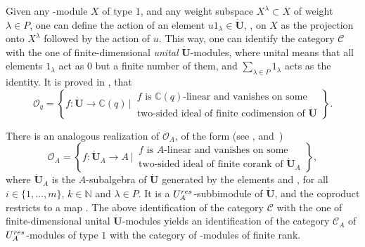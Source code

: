 \documentclass[11pt]{article}
\numberwithin{equation}{section}
\numberwithin{equation}{section}
\theoremstyle{definition}
\newcommand{\mc}{\mathbb{C}}
\newcommand{\mn}{\mathbb{N}}
\newcommand{\Oo}{{\mathcal O}}
\newcommand{\ra}{\rightarrow}
\begin{document}
Given any -module $X$ of type $1$, and any weight subspace $X^\lambda\subset X$ of weight $\lambda\in P$, one can define the action of an element $u 1_\lambda \in \dot{\mathbf{U}}$, , on $X$ as the projection onto $X^\lambda$ followed by the action of $u$. This way, one can identify the category $\mathcal{C}$ with the one of finite-dimensional {\it unital} $\dot{\mathbf{U}}$-modules, where unital means that all elements $1_\lambda$ act as $0$ but a finite number of them, and $ \sum_{\lambda\in P} 1_\lambda$ acts as the identity. It is proved in \cite[Section~29.5.1]{Lusztig}, that
\[%
\Oo_q = \left\lbrace f\colon \dot{\mathbf{U}} \ra \mc(q) \, \bigg\vert \, \begin{matrix} \text{$f$ is $\mc(q)$-linear and vanishes on some}\\ \text{two-sided ideal of finite codimension of $\dot{\mathbf{U}}$} \end{matrix}\right\rbrace.
\]

There is an analogous realization of $\Oo_A$, of the form (see \cite[Sections~23.2 and~29.5.2]{Lusztig}, and~\cite{Lusztig3})
\[%
\Oo_A = \left\lbrace f\colon \dot{\mathbf{U}}_A \ra A \, \bigg\vert \, \begin{matrix} \text{$f$ is $A$-linear and vanishes on some}\\ \text{two-sided ideal of finite corank of $\dot{\mathbf{U}}_A$} \end{matrix}\right\rbrace ,
\]
where $\dot{\mathbf{U}}_A$ is the $A$-subalgebra of $\dot{\mathbf{U}}$ generated by the elements  and , for all $i\in \{1,\dots,m\}$, $k\in \mn$ and $\lambda \in P$. It is a $U_A^{\rm res}$-subbimodule of $\dot{\mathbf{U}}$, and the coproduct restricts to a map \smash{$\Delta \colon \dot{\mathbf{U}}_A \ra \dot{\mathbf{U}}_A {}^{\hat{\otimes}2}$}. The above identification of the category $\mathcal{C}$ with the one of finite-dimensional unital $\dot{\mathbf{U}}$-modules yields an identification of the category $\mathcal{C}_A$ of $U_A^{\rm res}$-modules of type $1$ with the category of -modules of finite rank.
\end{document}
